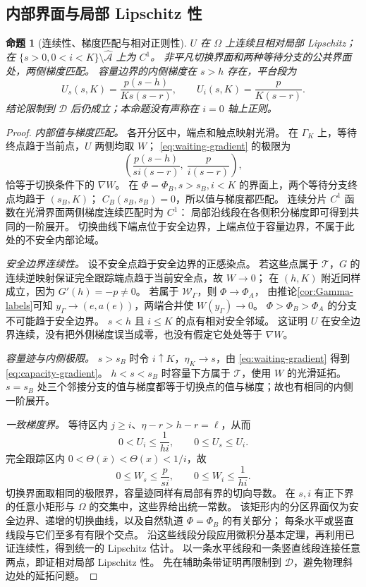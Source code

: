 \documentclass[11pt,a4paper,UTF8]{ctexart}
\newtheorem{proposition}[theorem]{命题}
\theoremstyle{definition}
\newcommand{\Acal}{\mathcal A}
\newcommand{\Dcal}{\mathcal D}
\begin{document}
\subsection{内部界面与局部 Lipschitz 性}
\begin{proposition}[连续性、梯度匹配与相对正则性]
\label{prop:regularity}
$U$ 在 $\Omega$ 上连续且相对局部 Lipschitz；在
$\{s>0,0<i<K\}\setminus\widehat{\Acal}$ 上为 $C^1$。
非平凡切换界面和两种等待分支的公共界面处，两侧梯度匹配。
容量边界的内侧梯度在 $s>h$ 存在，平台段为
\begin{equation}
U_s(s,K)=\frac{p(s-h)}{Ks(s-r)},\qquad U_i(s,K)=\frac p{K(s-r)}.
\label{eq:capacity-gradient}
\end{equation}
结论限制到 $\Dcal$ 后仍成立；本命题没有声称在 $i=0$ 轴上正则。
\end{proposition}
\begin{proof}
\emph{内部值与梯度匹配。}
各开分区中，端点和触点映射光滑。
在 $\Gamma_K$ 上，等待终点趋于当前点，$U$ 两侧均取 $W$；
\eqref{eq:waiting-gradient} 的极限为
\[
\left(\frac{p(s-h)}{si(s-r)},\ \frac p{i(s-r)}\right),
\]
恰等于切换条件下的 $\nabla W$。
在 $\Phi=\Phi_B,s>s_B,i<K$ 的界面上，两个等待分支终点均趋于 $(s_B,K)$；
$C_B(s_B,s_B)=0$，所以值与梯度都匹配。
连续分片 $C^1$ 函数在光滑界面两侧梯度连续匹配时为 $C^1$：
局部沿线段在各侧积分梯度即可得到共同的一阶展开。
切换曲线下端点位于安全边界，上端点位于容量边界，不属于此处的不安全内部论域。

\emph{安全边界连续性。}
设不安全点趋于安全边界的正感染点。
若这些点属于 $\mathcal T$，$G$ 的连续逆映射保证完全跟踪端点趋于当前安全点，故 $W\to0$；
在 $(h,K)$ 附近同样成立，因为 $G'(h)=-p\ne0$。
若属于 $\mathcal W_\Gamma$，则 $\Phi\to\Phi_A$，
由推论\ref{cor:Gamma-labels}可知 $y_\Gamma\to(e,a(e))$，两端合并使 $W(y_\Gamma)\to0$。
$\Phi>\Phi_B>\Phi_A$ 的分支不可能趋于安全边界。
$s<h$ 且 $i\le K$ 的点有相对安全邻域。
这证明 $U$ 在安全边界连续，没有把外侧梯度误当成零，也没有假定它处处等于 $\nabla W$。

\emph{容量迹与内侧极限。}
$s>s_B$ 时令 $i\uparrow K$，$\eta_K\to s$，由 \eqref{eq:waiting-gradient} 得到 \eqref{eq:capacity-gradient}。
$h<s<s_B$ 时容量下方属于 $\mathcal T$，使用 $W$ 的光滑延拓。
$s=s_B$ 处三个邻接分支的值与梯度都等于切换点的值与梯度；故也有相同的内侧一阶展开。

\emph{一致梯度界。}
等待区内 $j\ge i$、$\eta-r>h-r=\ell$，从而
\[
0<U_i\le\frac1{hi},\qquad0\le U_s\le U_i.
\]
完全跟踪区内 $0<\Theta(\bar x)<\Theta(x)<1/i$，故
\[
0\le W_s\le\frac p{si},\qquad0\le W_i\le\frac1{hi}.
\]
切换界面取相同的极限界，容量迹同样有局部有界的切向导数。
在 $s,i$ 有正下界的任意小矩形与 $\Omega$ 的交集中，这些界给出统一常数。
该矩形内的分区界面仅为安全边界、递增的切换曲线，以及自然轨道 $\Phi=\Phi_B$ 的有关部分；
每条水平或竖直线段与它们至多有有限个交点。
沿这些线段分段应用微积分基本定理，再利用已证连续性，得到统一的 Lipschitz 估计。
以一条水平线段和一条竖直线段连接任意两点，即证相对局部 Lipschitz 性。
先在辅助条带证明再限制到 $\Dcal$，避免物理斜边处的延拓问题。
\end{proof}
\end{document}
